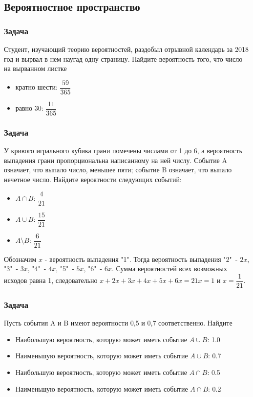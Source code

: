 \documentclass[a4paper,12pt]{article}
\begin{document}
\subsection{Вероятностное пространство}
\subsubsection*{Задача}
Студент, изучающий теорию вероятностей, раздобыл отрывной календарь за 2018 год и вырвал в нем наугад одну страницу. Найдите вероятность того, что число на вырванном листке \begin{itemize}
	\item кратно шести: \(\dfrac{59}{365}\)
	\item равно 30: \(\dfrac{11}{365}\)
\end{itemize}

\subsubsection*{Задача}
У кривого игрального кубика грани помечены числами от 1 до 6, а вероятность выпадения грани пропорциональна написанному на ней числу. Событие A означает, что выпало число, меньшее пяти; событие B означает, что выпало нечетное число. Найдите вероятности следующих событий:
\begin{itemize}
	\item \(A \cap B\): \(\dfrac{4}{21}\)
	\item \(A \cup B\): \(\dfrac{15}{21}\)
	\item \(A \setminus B\): \(\dfrac{6}{21}\) 
\end{itemize}
Обозначим \(x\) - вероятность выпадения "1". Тогда вероятность выпадения "2"\ - \(2x\), 
"3"\ - \(3x\), "4"\ - \(4x\), "5"\ - \(5x\), "6"\ - \(6x\). Сумма вероятностей всех возможных исходов равна 1, следовательно \(x + 2x + 3x+4x+5x+6x=21x=1\) и \(x=\dfrac{1}{21}\). 

\subsubsection*{Задача}
Пусть события A и B имеют вероятности 0,5 и 0,7 соответственно. Найдите
\begin{itemize}
	\item Наибольшую вероятность, которую может иметь событие \(A \cup B\): 1.0
	\item Наименьшую вероятность, которую может иметь событие \(A \cup B\): 0.7
	\item Наибольшую вероятность, которую может иметь событие \(A \cap B\): 0.5
	\item Наименьшую вероятность, которую может иметь событие \(A \cap B\): 0.2
\end{itemize}
\end{document}

